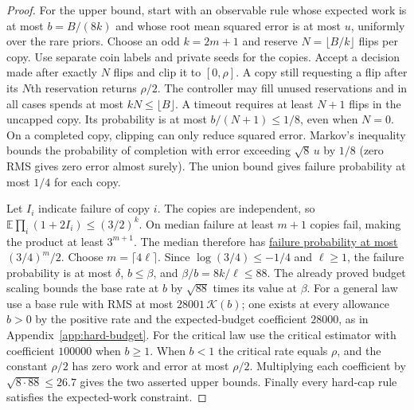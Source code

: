 \begin{proof}
\clearpage
For the upper bound, start with an observable rule whose expected work is
at most $b=B/(8k)$ and whose root mean squared error is at most $u$,
uniformly over the rare priors. Choose an odd $k=2m+1$ and reserve
$N=\lfloor B/k\rfloor$ flips per copy. Use separate coin labels and
private seeds for the copies. Accept a decision made after exactly $N$
flips and clip it to $[0,\rho]$. A copy still requesting a flip after its
$N$th reservation returns $\rho/2$. The controller may fill unused
reservations and in all cases spends at most $kN\le\lfloor B\rfloor$.
A timeout requires at least $N+1$ flips in the uncapped copy. Its
probability is at most $b/(N+1)\le1/8$, even when $N=0$.
On a completed copy, clipping can only reduce squared error. Markov's
inequality bounds the probability of completion with error exceeding
$\sqrt8\,u$ by $1/8$ (zero RMS gives zero error almost surely).
The union bound gives failure probability at most $1/4$ for each copy.

Let $I_i$ indicate failure of copy $i$. The copies are independent, so
$\mathbb E\prod_i(1+2I_i)\le(3/2)^k$. On median failure at least $m+1$
copies fail, making the product at least $3^{m+1}$. The median therefore
has \href{https://github.com/davidiach/adaptive-threshold-estimation/blob/fb4989c2bf21828214d74283ced14be44ec0b58d/lean/ThresholdHC/ConfidenceProgram/Amplify.lean}{failure probability at most $(3/4)^m/2$}. Choose $m=\lceil4\ell\rceil$.
Since $\log(3/4)\le-1/4$ and $\ell\ge1$, the failure probability is at
most $\delta$, $b\le\beta$, and $\beta/b=8k/\ell\le88$. The already
proved budget scaling bounds the base rate at $b$ by $\sqrt{88}$ times
its value at $\beta$. For a general law use a base rule with RMS at most
$28001\,\mathcal K(b)$; one exists at every allowance $b>0$ by the positive
rate and the expected-budget coefficient $28000$, as in
Appendix~\ref{app:hard-budget}. For the critical law use the critical
estimator with coefficient $100000$ when $b\ge1$. When $b<1$ the critical
rate equals $\rho$, and the constant $\rho/2$ has zero work and error at
most $\rho/2$. Multiplying
each coefficient by $\sqrt{8\cdot88}\le26.7$ gives the two asserted upper bounds.
Finally every hard-cap rule satisfies the expected-work constraint.
\end{proof}










